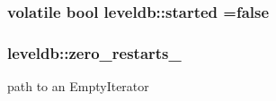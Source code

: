 \subsubsection[{started}]{\setlength{\rightskip}{0pt plus 5cm}volatile bool leveldb\+::started =false\hspace{0.3cm}{\ttfamily [static]}}\label{namespaceleveldb_a0e7f6672e194b1079b807f4fcf034599}
\hypertarget{namespaceleveldb_a361a49a125732028845c84785fd92f23}{}
\subsubsection[{zero\+\_\+restarts\+\_\+}]{ leveldb\+::zero\+\_\+restarts\+\_\+}\label{namespaceleveldb_a361a49a125732028845c84785fd92f23}


path to an Empty\+Iterator 

